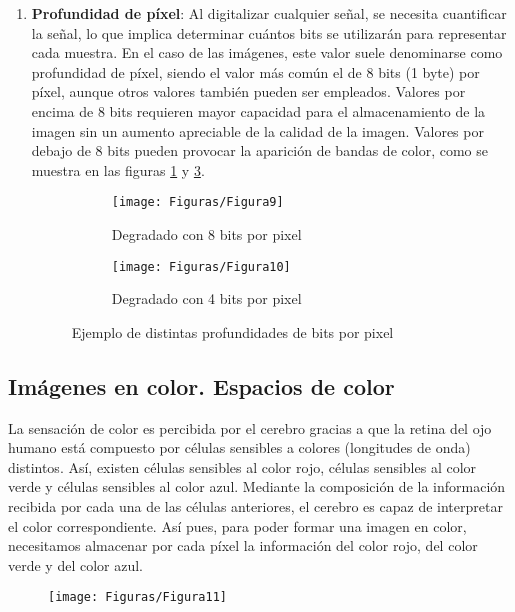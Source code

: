 \documentclass[es,practica]{uah}
\begin{document}
\begin{enumerate}
	\item {\bf Profundidad de píxel}: Al digitalizar cualquier señal, se necesita cuantificar la señal, lo que implica determinar cuántos bits se utilizarán para representar cada muestra. En el caso de las imágenes, este valor suele denominarse como profundidad de píxel, siendo el valor más común el de 8 bits (1 byte) por píxel, aunque otros valores también pueden ser empleados. Valores por encima de 8 bits requieren mayor capacidad para el almacenamiento de la imagen sin un aumento apreciable de la calidad de la imagen. Valores por debajo de 8 bits pueden provocar la aparición de bandas de color, como se muestra en las figuras \ref{fig:fig9} y \ref{fig:fig10}.

\begin{figure}[h!]
	\centering
	\begin{subfigure}
	  \centering
	  \texttt{[image: Figuras/Figura9]}
	  \caption{Degradado con 8 bits por pixel}
	  \label{fig:fig9}
	\end{subfigure}
	\begin{subfigure}
	  \centering
	  \texttt{[image: Figuras/Figura10]}
	  \caption{Degradado con 4 bits por pixel}
	  \label{fig:fig10}
	\end{subfigure}
	\caption{Ejemplo de distintas profundidades de bits por pixel}
	\end{figure}

\end{enumerate}

\subsection{Imágenes en color. Espacios de color}

La sensación de color es percibida por el cerebro gracias a que la retina del ojo humano está compuesto por células sensibles a colores (longitudes de onda) distintos. Así, existen células sensibles al color rojo, células sensibles al color verde y células sensibles al color azul. Mediante la composición de la información recibida por cada una de las células anteriores, el cerebro es capaz de interpretar el color correspondiente. Así pues, para poder formar una imagen en color, necesitamos almacenar por cada píxel la información del color rojo, del color verde y del color azul.


\begin{figure}[h!]
  \centering
  \texttt{[image: Figuras/Figura11]}
  \label{fig:fig11}
\end{figure}
\end{document}
